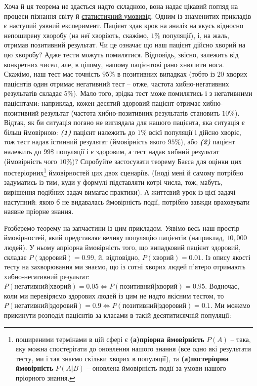 \documentclass[
  11pt,
]{book}
\begin{document}
Хоча й ця теорема не здається надто складною, вона надає цікавий погляд
на процеси пізнання світу й \hyperref[paradigms]{статистичний умовивід}.
Одним із знаменитих прикладів є наступий уявний експеримент. Пацієнт
здав кров на аналіз на якусь відносно непоширену хворобу (на неї
хворіють, скажімо, \(1\%\) популяції), і, на жаль, отримав позитивний
результат. Чи це означає що наш пацієнт дійсно хворий на цю хворобу?
Адже тести можуть помилятися. Відповідь, звісно, залежить від конкретних
чисел, але, в цілому, нашому пацієнтові рано хнюпити носа. Скажімо, наш
тест має точність \(95\%\) в позитивних випадках (тобто із \(20\) хворих
пацієнтів один отримає негативний тест -- отже, частота хибно-негативних
результатів складає \(5\%\)). Мало того, зрідка тест може помилятись і з
негативними пацієнтами: наприклад, кожен десятий здоровий пацієнт
отримає хибно-позитивний результат (частота хибно-позитивних результатів
становить \(10\%\)). Відтак, як би ситуація погано не виглядала для
нашого пацієнта, яка ситуація є більш ймовірною: \textbf{\emph{(1)}}
пацієнт належить до \(1\%\) всієї популяції і дійсно хворіє, тож тест
надав істинний результат (ймовірність якого \(95\%\)), або
\textbf{\emph{(2)}} пацієнт належить до \(99\$%
\) популяції і є здоровим, а тест надав хибний результат (ймовірність
чого \(10\%\))? Спробуйте застосувати теорему Баєса для оцінки цих
постеріорних\footnote{поширеними термінами в цій сфері є
  \textbf{(а)пріорна ймовірність} \(P(A)\) -- така, яку можна
  спостерігати до оновлення нашого знання (все одно які результати
  тесту, ми і так знаємо скільки хворих в популяції), та
  \textbf{(а)постеріорна ймовірність} \(P(A|B)\) -- оновлена ймовірність
  події за умови нашого пріорного знання.} ймовірностей цих двох
сценаріїв. (Іноді мені й самому потрібно задуматись із тим, куди у
формулі підставляти котрі числа, тож, мабуть, вирішення подібних задач
вимагає практики). А життєвий урок із цієї задачі наступний: якою б не
видавалась ймовірність події, потрібно завжди враховувати наявне пріорне
знання.

Розберемо теорему на запчастини із цим прикладом. Уявімо весь наш
простір ймовірностей, який представляє велику популяцію пацієнтів
(наприклад, \(10,000\) людей). У ньому апріорна ймовірність того, що
випадковий пацієнт здоровий, складає \(P(\text{здоровий}) = 0.99\), й,
відповідно, \(P(\text{хворий}) = 0.01\). Із опису якості тесту на
захворювання ми знаємо, що із сотні хворих людей п'ятеро отримають
хибно-негативний результат:
\(P(\text{негативний|хворий}) = 0.05 \Leftrightarrow P(\text{позитивний|хворий}) = 0.95\).
Водночас, коли ми перевіряємо здорових людей із цим не надто якісним
тестом, то
\(P(\text{негативний|здоровий}) = 0.9 \Leftrightarrow P(\text{позитивний|здоровий}) = 0.1\).
Ми можемо прикинути розподіл пацієнтів за класами в такій десятитисячній
популяції:
\end{document}
